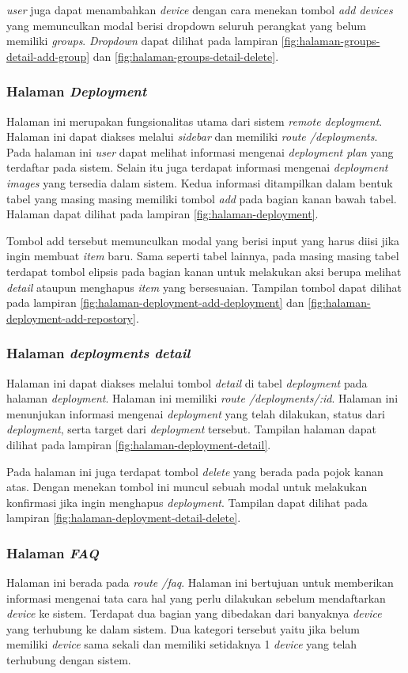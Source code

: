 \textit{user} juga dapat menambahkan \textit{device} dengan cara menekan tombol \textit{add devices} yang memunculkan modal berisi dropdown seluruh perangkat yang belum memiliki \textit{groups}. \textit{Dropdown} dapat dilihat pada lampiran \ref{fig:halaman-groups-detail-add-group} dan \ref{fig:halaman-groups-detail-delete}.

\subsubsection{Halaman \textit{Deployment}}
Halaman ini merupakan fungsionalitas utama dari sistem \textit{remote deployment}. Halaman ini dapat diakses melalui \textit{sidebar} dan memiliki \textit{route /deployments}. Pada halaman ini \textit{user} dapat melihat informasi mengenai \textit{deployment plan} yang terdaftar pada sistem. Selain itu juga terdapat informasi mengenai \textit{deployment images} yang tersedia dalam sistem. Kedua informasi ditampilkan dalam bentuk tabel yang masing masing memiliki tombol \textit{add} pada bagian kanan bawah tabel. Halaman dapat dilihat pada lampiran \ref{fig:halaman-deployment}.

Tombol add tersebut memunculkan modal yang berisi input yang harus diisi jika ingin membuat \textit{item} baru. Sama seperti tabel lainnya, pada masing masing tabel terdapat tombol elipsis pada bagian kanan untuk melakukan aksi berupa melihat \textit{detail} ataupun menghapus \textit{item} yang bersesuaian. Tampilan tombol dapat dilihat pada lampiran \ref{fig:halaman-deployment-add-deployment} dan \ref{fig:halaman-deployment-add-repostory}.

\subsubsection{Halaman \textit{deployments detail}}
Halaman ini dapat diakses melalui tombol \textit{detail} di tabel \textit{deployment} pada halaman \textit{deployment}. Halaman ini memiliki \textit{route /deployments/:id}. Halaman ini menunjukan informasi mengenai \textit{deployment} yang telah dilakukan, status dari \textit{deployment}, serta target dari \textit{deployment} tersebut. Tampilan halaman dapat dilihat pada lampiran \ref{fig:halaman-deployment-detail}.

Pada halaman ini juga terdapat tombol \textit{delete} yang berada pada pojok kanan atas. Dengan menekan tombol ini muncul sebuah modal untuk melakukan konfirmasi jika ingin menghapus \textit{deployment}. Tampilan dapat dilihat pada lampiran \ref{fig:halaman-deployment-detail-delete}.

\subsubsection{Halaman \textit{FAQ}}
Halaman ini berada pada \textit{route /faq}. Halaman ini bertujuan untuk memberikan informasi mengenai tata cara hal yang perlu dilakukan sebelum mendaftarkan \textit{device} ke sistem. Terdapat dua bagian yang dibedakan dari banyaknya \textit{device} yang terhubung ke dalam sistem. Dua kategori tersebut yaitu jika belum memiliki \textit{device} sama sekali dan memiliki setidaknya 1 \textit{device} yang telah terhubung dengan sistem.
